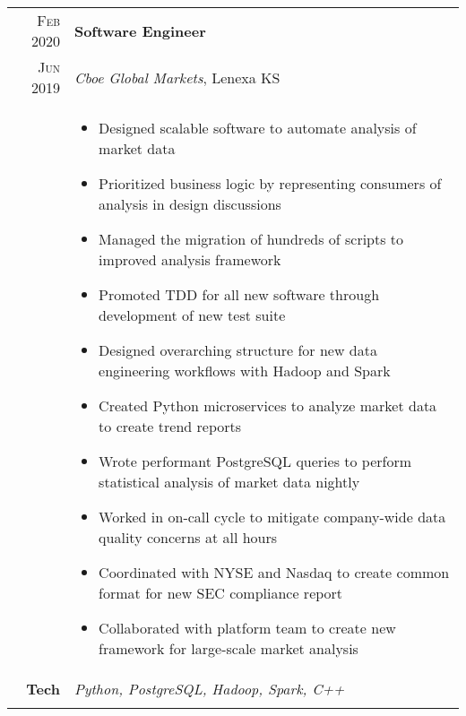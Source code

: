 \documentclass[a4paper,10pt]{article}
\newcommand{\br}{\\\multicolumn{2}{c}{}}
\begin{document}
\begin{tabular}{r|p{15cm}}
  \textsc{Feb 2020}  & \textbf{Software Engineer} \\
  \textsc{Jun 2019}  & \textit{Cboe Global Markets}, Lenexa KS
  \\ &
       \begin{itemize}
       \item Designed scalable software to automate analysis of market data
       \item Prioritized business logic by representing consumers of analysis in design discussions
       \item Managed the migration of hundreds of scripts to improved analysis framework
       \item Promoted TDD for all new software through development of new test suite
       \item Designed overarching structure for new data engineering workflows with Hadoop and Spark
       \item Created Python microservices to analyze market data to create trend reports
       \item Wrote performant PostgreSQL queries to perform statistical analysis of market data nightly
       \item Worked in on-call cycle to mitigate company-wide data quality concerns at all hours
       \item Coordinated with NYSE and Nasdaq to create common format for new SEC compliance report
       \item Collaborated with platform team to create new framework for large-scale market analysis
       \end{itemize} \\
  \textbf{Tech} & \textit{Python, PostgreSQL, Hadoop, Spark, C++} \br \\
\end{tabular}
\end{document}
